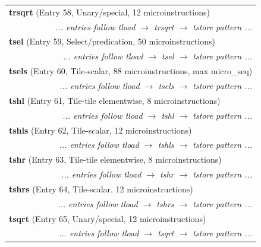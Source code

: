\begin{longtable}{r r r r r r r r}
\multicolumn{8}{l}{\textbf{trsqrt} (Entry 58, Unary/special, 12 microinstructions)} \\
  & \multicolumn{7}{r}{\textit{... entries follow tload $\rightarrow$ trsqrt $\rightarrow$ tstore pattern ...}} \\

\multicolumn{8}{l}{\textbf{tsel} (Entry 59, Select/predication, 50 microinstructions)} \\
  & \multicolumn{7}{r}{\textit{... entries follow tload $\rightarrow$ tsel $\rightarrow$ tstore pattern ...}} \\

\multicolumn{8}{l}{\textbf{tsels} (Entry 60, Tile-scalar, 88 microinstructions, max micro\_seq)} \\
  & \multicolumn{7}{r}{\textit{... entries follow tload $\rightarrow$ tsels $\rightarrow$ tstore pattern ...}} \\

\multicolumn{8}{l}{\textbf{tshl} (Entry 61, Tile-tile elementwise, 8 microinstructions)} \\
  & \multicolumn{7}{r}{\textit{... entries follow tload $\rightarrow$ tshl $\rightarrow$ tstore pattern ...}} \\

\multicolumn{8}{l}{\textbf{tshls} (Entry 62, Tile-scalar, 12 microinstructions)} \\
  & \multicolumn{7}{r}{\textit{... entries follow tload $\rightarrow$ tshls $\rightarrow$ tstore pattern ...}} \\

\multicolumn{8}{l}{\textbf{tshr} (Entry 63, Tile-tile elementwise, 8 microinstructions)} \\
  & \multicolumn{7}{r}{\textit{... entries follow tload $\rightarrow$ tshr $\rightarrow$ tstore pattern ...}} \\

\multicolumn{8}{l}{\textbf{tshrs} (Entry 64, Tile-scalar, 12 microinstructions)} \\
  & \multicolumn{7}{r}{\textit{... entries follow tload $\rightarrow$ tshrs $\rightarrow$ tstore pattern ...}} \\

\multicolumn{8}{l}{\textbf{tsqrt} (Entry 65, Unary/special, 12 microinstructions)} \\
  & \multicolumn{7}{r}{\textit{... entries follow tload $\rightarrow$ tsqrt $\rightarrow$ tstore pattern ...}} \\


\end{longtable}
